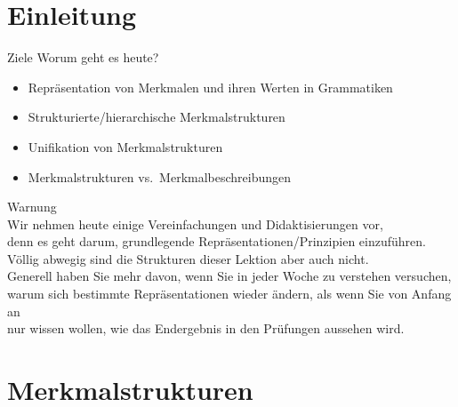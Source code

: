 
\section{Einleitung}

\begin{frame}
  {Ziele}
  \onslide<+->
  \onslide<+->
  Worum geht es heute?\\
  \Zeile
  \begin{itemize}[<+->]
    \item Repräsentation von Merkmalen und ihren Werten in Grammatiken
    \item Strukturierte\slash hierarchische Merkmalstrukturen
    \item Unifikation von Merkmalstrukturen
    \item Merkmalstrukturen vs.\ Merkmalbeschreibungen
  \end{itemize}
  \Zeile
  \centering
  \onslide<+->
\end{frame}

\begin{frame}
  {Warnung}
  \onslide<+->
  \onslide<+->
  \centering 
  \LARGE
  \\
  \Zeile
  \onslide<+->
  \normalsize
  Wir nehmen heute einige Vereinfachungen und Didaktisierungen vor,\\
  denn es geht darum, grundlegende Repräsentationen\slash Prinzipien einzuführen.\\
  \Zeile
  \onslide<+->
  Völlig abwegig sind die Strukturen dieser Lektion aber auch nicht.\\
  \Zeile
  \onslide<+->
  Generell haben Sie mehr davon, wenn Sie in jeder Woche zu verstehen versuchen,\\
  warum sich bestimmte Repräsentationen wieder ändern, als wenn Sie von Anfang an\\
  nur wissen wollen, wie das Endergebnis in den Prüfungen aussehen wird.
\end{frame}

\section{Merkmalstrukturen}

